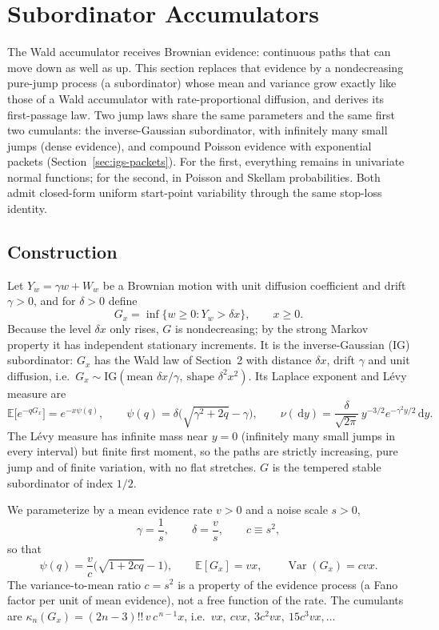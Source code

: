 \documentclass[12pt]{article}
\newcommand{\dd}{\,\mathrm{d}}
\begin{document}
\section{Subordinator Accumulators}
\label{sec:igs}
The Wald accumulator receives Brownian evidence: continuous paths that can move down as well as up. This section replaces that evidence by a nondecreasing pure-jump process (a subordinator) whose mean and variance grow exactly like those of a Wald accumulator with rate-proportional diffusion, and derives its first-passage law. Two jump laws share the same parameters and the same first two cumulants: the inverse-Gaussian subordinator, with infinitely many small jumps (dense evidence), and compound Poisson evidence with exponential packets (Section~\ref{sec:igs-packets}). For the first, everything remains in univariate normal functions; for the second, in Poisson and Skellam probabilities. Both admit closed-form uniform start-point variability through the same stop-loss identity.

\subsection{Construction}
Let $Y_w=\gamma w+W_w$ be a Brownian motion with unit diffusion coefficient and drift $\gamma>0$, and for $\delta>0$ define
\begin{equation}
  G_x=\inf\{w\ge0:Y_w>\delta x\},\qquad x\ge0 .
\end{equation}
Because the level $\delta x$ only rises, $G$ is nondecreasing; by the strong Markov property it has independent stationary increments. It is the inverse-Gaussian (IG) subordinator: $G_x$ has the Wald law of Section~2 with distance $\delta x$, drift $\gamma$ and unit diffusion, i.e.\ $G_x\sim\mathrm{IG}(\text{mean }\delta x/\gamma,\ \text{shape }\delta^2x^2)$. Its Laplace exponent and L\'evy measure are
\begin{equation}
  \mathbb E\big[e^{-qG_x}\big]=e^{-x\psi(q)},\qquad
  \psi(q)=\delta\big(\sqrt{\gamma^2+2q}-\gamma\big),\qquad
  \nu(\dd y)=\frac{\delta}{\sqrt{2\pi}}\,y^{-3/2}e^{-\gamma^2y/2}\dd y .
\end{equation}
The L\'evy measure has infinite mass near $y=0$ (infinitely many small jumps in every interval) but finite first moment, so the paths are strictly increasing, pure jump and of finite variation, with no flat stretches. $G$ is the tempered stable subordinator of index $1/2$.

We parameterize by a mean evidence rate $v>0$ and a noise scale $s>0$,
\begin{equation}
  \gamma=\frac1s,\qquad \delta=\frac vs,\qquad c\equiv s^2,
\end{equation}
so that
\begin{equation}
  \psi(q)=\frac vc\big(\sqrt{1+2cq}-1\big),\qquad
  \mathbb E[G_x]=vx,\qquad \operatorname{Var}(G_x)=cvx .
\end{equation}
The variance-to-mean ratio $c=s^2$ is a property of the evidence process (a Fano factor per unit of mean evidence), not a free function of the rate. The cumulants are $\kappa_n(G_x)=(2n-3)!!\,v\,c^{\,n-1}x$, i.e.\ $vx,\ cvx,\ 3c^2vx,\ 15c^3vx,\dots$
\end{document}
